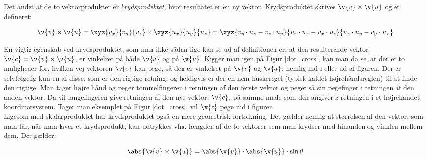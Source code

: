Det andet af de to vektorprodukter er \emph{krydsproduktet}, hvor resultatet er en ny vektor. Krydsproduktet skrives $\v{v} \times \v{u}$ og er defineret:

\begin{equation}
\v{v} \times \v{u} = \xyz{v_x}{v_y}{v_z} \times \xyz{u_x}{u_y}{u_z} = \xyz{v_y \cdot u_z - v_z \cdot u_y}{v_z \cdot u_x - v_x \cdot u_z}{v_x \cdot u_y - v_y \cdot u_x}
\end{equation} 

\vspace{2mm}

En vigtig egenskab ved krydsproduktet, som man ikke sådan lige kan se ud af definitionen er, at den resulterende vektor, $\v{c} = \v{v} \times \v{u}$, er vinkelret på både $\v{v}$ og på $\v{u}$. Kigger man igen på Figur \ref{dot_cross}, kan man da se, at der er to muligheder for, hvilken vej vektoren $\v{c}$ kan pege, så den er vinkelret på $\v{v}$ og $\v{u}$; nemlig ind i eller ud af figuren. Der er selvfølgelig kun en af disse, som er den rigtige retning, og heldigvis er der en nem huskeregel (typisk kaldet højrehåndsreglen) til at finde den rigtige. Man tager højre hånd og peger tommelfingeren i retningen af den første vektor og peger så sin pegefinger i retningen af den anden vektor. Da vil langefingeren give retningen af den nye vektor, $\v{c}$, på samme måde som den angiver $z$-retningen i et højrehåndet koordinatsystem. Tager man eksemplet på Figur \ref{dot_cross}, vil $\v{c}$ pege ind i figuren.\\
Ligesom med skalarproduktet har krydsproduktet også en mere geometrisk fortolkning. Det gælder nemlig at størrelsen af den vektor, som man får, når man laver et krydsprodukt, kan udtrykkes vha. længden af de to vektorer som man krydser med hinanden og vinklen mellem dem. Der gælder:

\begin{equation}
\abs{\v{v} \times \v{u}} = \abs{\v{v}} \cdot \abs{\v{u}} \cdot \sin \theta 
\end{equation}

\vspace{2mm}


